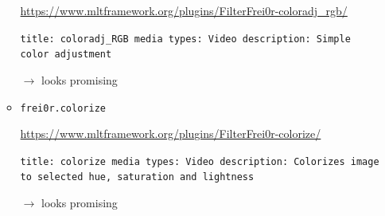\documentclass[12pt,a4paper]{article}
\begin{document}
\begin{itemize}
\begin{itemize}
		\url{https://www.mltframework.org/plugins/FilterFrei0r-coloradj_rgb/}
		
		\texttt{title: coloradj\_RGB \newline
			media types: Video \newline
			description: Simple color adjustment}
		
		$\rightarrow$ looks promising
		
		
		\item \texttt{frei0r.colorize}
		
		\url{https://www.mltframework.org/plugins/FilterFrei0r-colorize/}
		
		\texttt{title: colorize \newline
			media types: Video \newline
			description: Colorizes image to selected hue, saturation and lightness}
		
		$\rightarrow$ looks promising
		
		
	\end{itemize}


\end{itemize}



\newpage

\begin{spacing}{1}
	\printbibliography
\end{spacing}
	
	
	
\end{document}
